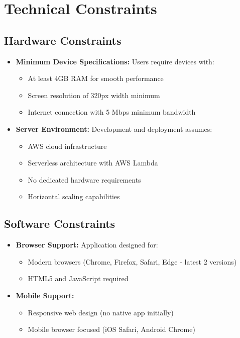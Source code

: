 \documentclass[a4paper, 11pt]{scrreprt}
\begin{document}
\section{Technical Constraints}

\subsection{Hardware Constraints}
\begin{itemize}
    \item \textbf{Minimum Device Specifications:} Users require devices with:
    \begin{itemize}
        \item At least 4GB RAM for smooth performance
        \item Screen resolution of 320px width minimum
        \item Internet connection with 5 Mbps minimum bandwidth
    \end{itemize}
    
    \item \textbf{Server Environment:} Development and deployment assumes:
    \begin{itemize}
        \item AWS cloud infrastructure
        \item Serverless architecture with AWS Lambda
        \item No dedicated hardware requirements
        \item Horizontal scaling capabilities
    \end{itemize}
\end{itemize}

\subsection{Software Constraints}
\begin{itemize}
    \item \textbf{Browser Support:} Application designed for:
    \begin{itemize}
        \item Modern browsers (Chrome, Firefox, Safari, Edge - latest 2 versions)
        \item HTML5 and JavaScript required
    \end{itemize}
    
    \item \textbf{Mobile Support:}
    \begin{itemize}
        \item Responsive web design (no native app initially)
        \item Mobile browser focused (iOS Safari, Android Chrome)
    \end{itemize}
\end{itemize}
\end{document}
